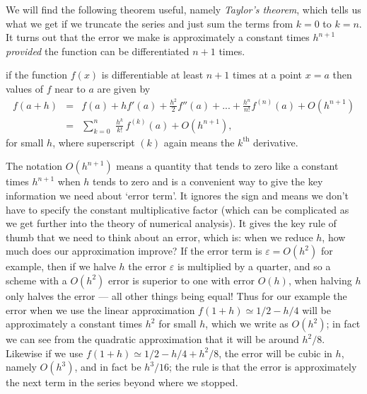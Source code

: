 We will find the following theorem useful, namely \emph{Taylor's theorem}, which tells us what we get if
we truncate the series and just sum the terms from $k=0$ to $k=n$. It turns out that the error we make is 
approximately a constant times $h^{n+1}$ \emph{provided} the function can be differentiated $n+1$ times. 

\vspace{2mm}
 if the function $ f(x) $ is differentiable at least $n+1$ times at a point $ x=a $
then values of $ f $ near to $a$ are given by 
\begin{eqnarray}
f(a+h) & = & f(a) + h f'(a)
   + \frac{h^2}{2}f''(a) + ... + \frac{h^{n}}{n!} f^{(n)}(a) + O(h^{n+1}) \nonumber \\ 
 & = & \sum_{k=0}^{n} \, \, \frac{h^{k}}{k!} \, f^{(k)}(a) +O(h^{n+1}) ,
\label{eq:taylor_series}
\end{eqnarray}
for small $h$, where superscript $(k)$ again means the $k^\mathrm{th}$ derivative.
\vspace{2mm}

The notation $O(h^{n+1})$ means a quantity that 
%
%
tends to zero like a constant times $h^{n+1}$ when $h$ tends to zero and is a convenient way to give the key information we need about 
 `error  term'.
%
It ignores the sign and means we don't have to specify the constant 
multiplicative factor (which can be complicated as we get further into the theory of numerical analysis).
It gives the key rule of thumb that we need to think about an error, which is: when we reduce $h$, how 
much does our approximation improve? If the error term is $\varepsilon = O(h^2)$ for example, then if we halve $h$ the 
error $\varepsilon$ is multiplied by a quarter, and so a scheme with a $O(h^2)$ error is superior to one with error $O(h)$, when 
halving $h$ only halves the error --- all other things being equal! 
% 
Thus for our example the error when we use the linear approximation $f(1+h)  \simeq  1/2  - h / 4 $ will be 
approximately a constant times $h^2$ for small $h$, which we write as $O(h^2)$; in fact we can see from the quadratic approximation that it will be 
around $h^2/8$. Likewise if we use $f(1+h)  \simeq  1/2  - h / 4  + h^2/8$, the error will be cubic in $h$, namely $O(h^3)$, and in fact be 
$h^3/16$; the rule is that the error is approximately the next term in the series beyond where we stopped. 

